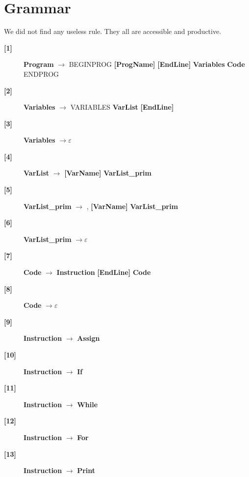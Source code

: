 \documentclass[12pt]{article}
\begin{document}
\section{Grammar}
We did not find any useless rule. They all are accessible and productive.
\begin{description}
	\item[\textbf{[1]}]{ \textbf{\textlangle{}Program\textrangle{}}  $\rightarrow$ BEGINPROG \textbf{[ProgName]} \textbf{[EndLine]} \textbf{\textlangle{}Variables\textrangle{}}  \textbf{\textlangle{}Code\textrangle{}}  ENDPROG}
	\item[\textbf{[2]}]{ \textbf{\textlangle{}Variables\textrangle{}}  $\rightarrow$ VARIABLES \textbf{\textlangle{}VarList\textrangle{}}  \textbf{[EndLine]}}
	\item[\textbf{[3]}]{ \textbf{\textlangle{}Variables\textrangle{}}  $\rightarrow \varepsilon$}
	\item[\textbf{[4]}]{ \textbf{\textlangle{}VarList\textrangle{}}  $\rightarrow$ \textbf{[VarName]} \textbf{\textlangle{}VarList\_prim\textrangle{}} }
	\item[\textbf{[5]}]{ \textbf{\textlangle{}VarList\_prim\textrangle{}}  $\rightarrow$ , \textbf{[VarName]} \textbf{\textlangle{}VarList\_prim\textrangle{}} }
	\item[\textbf{[6]}]{ \textbf{\textlangle{}VarList\_prim\textrangle{}}  $\rightarrow \varepsilon$}
	\item[\textbf{[7]}]{ \textbf{\textlangle{}Code\textrangle{}}  $\rightarrow$ \textbf{\textlangle{}Instruction\textrangle{}}  \textbf{[EndLine]} \textbf{\textlangle{}Code\textrangle{}} }
	\item[\textbf{[8]}]{ \textbf{\textlangle{}Code\textrangle{}}  $\rightarrow \varepsilon$}
	\item[\textbf{[9]}]{ \textbf{\textlangle{}Instruction\textrangle{}}  $\rightarrow$ \textbf{\textlangle{}Assign\textrangle{}} }
	\item[\textbf{[10]}]{ \textbf{\textlangle{}Instruction\textrangle{}}  $\rightarrow$ \textbf{\textlangle{}If\textrangle{}} }
	\item[\textbf{[11]}]{ \textbf{\textlangle{}Instruction\textrangle{}}  $\rightarrow$ \textbf{\textlangle{}While\textrangle{}} }
	\item[\textbf{[12]}]{ \textbf{\textlangle{}Instruction\textrangle{}}  $\rightarrow$ \textbf{\textlangle{}For\textrangle{}} }
	\item[\textbf{[13]}]{ \textbf{\textlangle{}Instruction\textrangle{}}  $\rightarrow$ \textbf{\textlangle{}Print\textrangle{}} }

\end{description}
\end{document}
